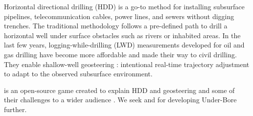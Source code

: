 Horizontal directional drilling (HDD) is a go-to method for installing subsurface pipelines, telecommunication cables, power lines, and sewers without digging trenches. 
The traditional methodology follows a pre-defined path to drill a horizontal well under surface obstacles such as rivers or inhabited areas. 
In the last few years, logging-while-drilling (LWD) measurements developed for oil and gas drilling have become more affordable and made their way to civil drilling. 
They enable shallow-well geosteering \cite{johnson2021using,ungemach2021real}: intentional real-time trajectory adjustment to adapt to the observed subsurface environment.

 \cite{underbore2022} is an open-source game created to explain HDD and geosteering and some of their challenges to a wider audience \cite{coding2022,practical2022}. 
We seek  and  for developing Under-Bore further.